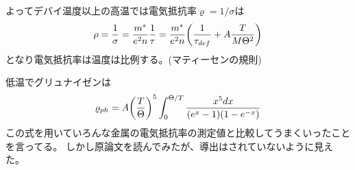 \documentclass[11pt,dvipdfmx,a4paper]{jsarticle}
\begin{document}
よってデバイ温度以上の高温では電気抵抗率\(\varrho=1/\sigma\)は
\begin{align}
    \rho = \frac{1}{\sigma} = \frac{m^*}{e^2n} \frac{1}{\tau}
    = \frac{m^*}{e^2n} \qty(\frac{1}{\tau_{def}} + A\frac{T}{M\Theta^2})
\end{align}
となり電気抵抗率は温度は比例する。(マティーセンの規則)

低温でグリュナイゼン\cite{Grueneisen}は
\begin{align}
    \varrho_{ph}=A\qty(\frac{T}{\Theta})^5\int_0^{\Theta/T} \frac{x^5dx}{(e^x-1)(1-e^{-x})} %
\end{align}
この式を用いていろんな金属の電気抵抗率の測定値と比較してうまくいったことを言ってる。
しかし原論文を読んでみたが、導出はされていないように見えた。
\end{document}

